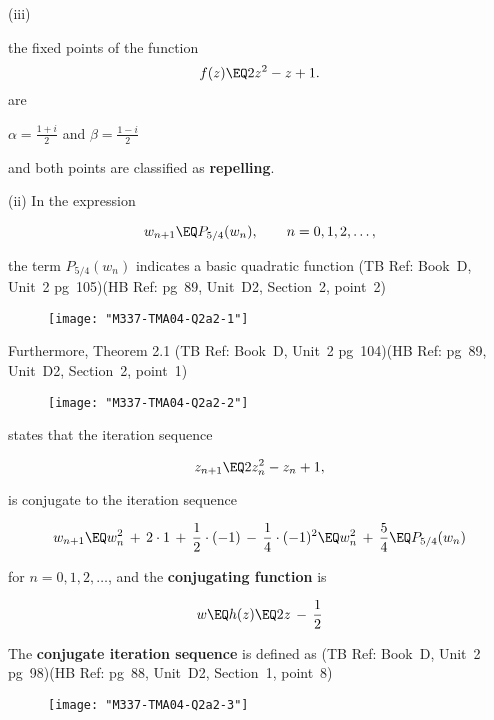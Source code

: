 \documentclass[english,a4paper,11pt]{scrartcl}
\begin{document}
\begin{labeling}{(iii) }
\bigskip
\begin{Answer}
the fixed points of the function 
 \[ f(z) \EQ 2z^2 - z + 1. \]
are
\begin{center}
$\alpha = \displaystyle \frac{1+i}{2}$ \; and \; $\beta = \displaystyle \frac{1-i}{2}$ \\
\end{center}
\bigskip
and both points are classified as \textbf{repelling}. \hspace{4cm} ~
\end{Answer}


\newpage
  \item [(ii)]  In the expression
  
\[ w_{n+1} \EQ P_{5/4}(w_n), \qquad n = 0,1,2, \dots, \]

the term $P_{5/4}(w_n)$ indicates a basic quadratic function (TB Ref: Book~D, Unit~2 pg~105)(HB Ref: pg~89, Unit~D2, Section~2, point~2) \\
  
\begin{figure}[H]
	\centering
	\texttt{[image: "M337-TMA04-Q2a2-1"]}
\end{figure}

Furthermore, Theorem 2.1 (TB Ref: Book~D, Unit~2 pg~104)(HB Ref: pg~89, Unit~D2, Section~2, point~1) \\

\begin{figure}[H]
	\centering
	\texttt{[image: "M337-TMA04-Q2a2-2"]}
\end{figure}

states that the iteration sequence

\[ z_{n+1} \EQ 2z_n^2 - z_n + 1,   \]

is conjugate to the iteration sequence

\[ w_{n+1} \EQ w_n^2 \,+\, 2 \cdot 1 \,+\, \frac1{2} \cdot (-1) \,-\,\frac1{4} \cdot (-1)^2 \EQ w_n^2 \,+\, \frac{5}{4} \EQ P_{5/4}(w_n)   \]

\bigskip
for $n = 0,1,2, \dots$, and the \textbf{conjugating function} is

\[ w \EQ h(z) \EQ 2z \,-\, \frac1{2} \] 

\bigskip
The \textbf{conjugate iteration sequence} is defined as (TB Ref: Book~D, Unit~2 pg~98)(HB Ref: pg~88, Unit~D2, Section~1, point~8) \\

\begin{figure}[H]
	\centering
	\texttt{[image: "M337-TMA04-Q2a2-3"]}
\end{figure}


\end{labeling}
\end{document}
